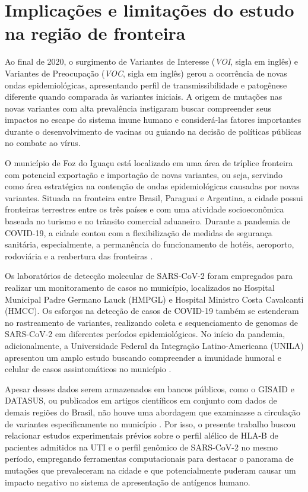 \begin{justifying}
\begin{figure}
\end{figure}

\vspace{2cm}

\section{Implicações e limitações do estudo na região de fronteira}

Ao final de 2020, o surgimento de Variantes de Interesse (\textit{VOI}, sigla em inglês) e Variantes de Preocupação (\textit{VOC}, sigla em inglês) gerou a ocorrência de novas ondas epidemiológicas, apresentando perfil de transmissibilidade e patogênese diferente quando comparada às variantes iniciais. A origem de mutações nas novas variantes com alta prevalência instigaram buscar compreender seus impactos no escape do sistema imune humano e considerá-las fatores importantes durante o desenvolvimento de vacinas ou guiando na decisão de políticas públicas no combate ao vírus.	

O município  de Foz do Iguaçu está localizado em uma área de tríplice fronteira com potencial exportação e importação de novas variantes, ou seja, servindo como área estratégica na contenção de ondas epidemiológicas causadas por novas variantes. Situada na fronteira entre Brasil, Paraguai e Argentina, a cidade possui fronteiras terrestres entre os três países e com uma atividade socioeconômica baseada no turismo e no trânsito comercial aduaneiro. Durante a pandemia de COVID-19, a cidade contou com a flexibilização de medidas de segurança sanitária, especialmente, a permanência do funcionamento de hotéis, aeroporto, rodoviária e a reabertura das fronteiras \cite{Rivas:2020}. 

Os laboratórios de detecção molecular de SARS-CoV-2 foram empregados para realizar um monitoramento de casos no município, localizados no Hospital Municipal Padre Germano Lauck (HMPGL) e Hospital Ministro Costa Cavalcanti (HMCC). Os esforços na detecção de casos de COVID-19 também se estenderam no rastreamento de variantes, realizando coleta e sequenciamento de genomas de SARS-CoV-2 em diferentes períodos epidemiológicos. No início da pandemia, adicionalmente, a Universidade Federal da Integração Latino-Americana (UNILA) apresentou um amplo estudo buscando compreender a imunidade humoral e celular de casos assintomáticos no município \cite{Viana:2021}. 

Apesar desses dados serem armazenados em bancos públicos, como o GISAID e DATASUS,  ou publicados em artigos científicos em conjunto com dados de demais regiões do Brasil, não houve uma abordagem que examinasse  a circulação de variantes especificamente no município \cite{Giovanetti:2022}. Por isso, o presente trabalho buscou relacionar estudos experimentais prévios sobre o perfil alélico de HLA-B de pacientes admitidos na UTI e o perfil genômico de SARS-CoV-2 no mesmo período, empregando ferramentas computacionais para destacar o panorama de mutações que prevaleceram na cidade e que potencialmente puderam causar um impacto negativo no sistema de apresentação de antígenos humano.


\end{justifying}
